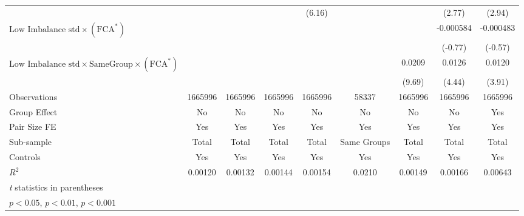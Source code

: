 {\begin{tabular}{l*{8}{c}}
                &                  &                  &                  &   (6.16)         &                  &                  &   (2.77)         &   (2.94)         \\
[1em]
 $ \text{Low Imbalance std} \times (\text{FCA}^*)  $ &                  &                  &                  &                  &                  &                  &-0.000584         &-0.000483         \\
                &                  &                  &                  &                  &                  &                  &  (-0.77)         &  (-0.57)         \\
[1em]
 $ \text{Low Imbalance std} \times {\text{SameGroup} } \times (\text{FCA}^*)  $ &                  &                  &                  &                  &                  &   0.0209\sym{***}&   0.0126\sym{***}&   0.0120\sym{***}\\
                &                  &                  &                  &                  &                  &   (9.69)         &   (4.44)         &   (3.91)         \\
\hline
Observations    &  1665996         &  1665996         &  1665996         &  1665996         &    58337         &  1665996         &  1665996         &  1665996         \\
Group Effect    &       No         &       No         &       No         &       No         &       No         &       No         &       No         &      Yes         \\
Pair Size FE    &      Yes         &      Yes         &      Yes         &      Yes         &      Yes         &      Yes         &      Yes         &      Yes         \\
Sub-sample      &    Total         &    Total         &    Total         &    Total         &Same Groups         &    Total         &    Total         &    Total         \\
Controls        &      Yes         &      Yes         &      Yes         &      Yes         &      Yes         &      Yes         &      Yes         &      Yes         \\
$ R^2 $         &  0.00120         &  0.00132         &  0.00144         &  0.00154         &   0.0210         &  0.00149         &  0.00166         &  0.00643         \\
\hline\hline
\multicolumn{9}{l}{\footnotesize \textit{t} statistics in parentheses}\\
\multicolumn{9}{l}{\footnotesize \sym{*} \(p<0.05\), \sym{**} \(p<0.01\), \sym{***} \(p<0.001\)}\\
\end{tabular}
}
